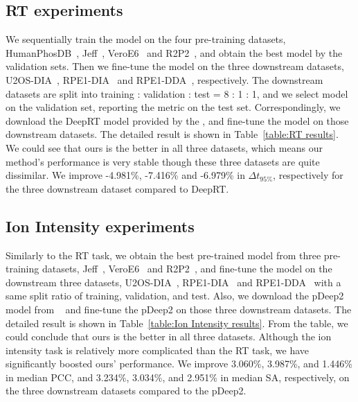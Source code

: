 \subsection{RT experiments}
We sequentially train the model on the four pre-training datasets, HumanPhosDB~\cite{lawrence2016plug}, Jeff~\cite{liu2018vivo}, VeroE6~\cite{bouhaddou2020global} and R2P2~\cite{leutert2019r2}, and obtain the best model by the validation sets. Then we fine-tune the model on the three downstream datasets, U2OS-DIA~\cite{wang2020naguider}, RPE1-DIA~\cite{bekker2020rapid} and RPE1-DDA~\cite{bekker2020rapid}, respectively. 
The downstream datasets are split into training : validation : test = 8 : 1 : 1, and we select model on the validation set, reporting the metric on the test set. 
Correspondingly, we download the DeepRT model provided by the \cite{ma2018improved}, and fine-tune the model on those downstream datasets. The detailed result is shown in Table~\ref{table:RT results}. We could see that ours is the better in all three datasets, which means our method's performance is very stable though these three datasets are quite dissimilar. We improve -4.981\%, -7.416\% and -6.979\% in $\Delta$$t_{95\%}$, respectively for the three downstream dataset compared to DeepRT. 

\subsection{Ion Intensity experiments}
Similarly to the RT task, we obtain the best pre-trained model from three pre-training datasets, Jeff~\cite{liu2018vivo}, VeroE6~\cite{bouhaddou2020global} and R2P2~\cite{leutert2019r2}, and fine-tune the model on the downstream three datasets, U2OS-DIA~\cite{wang2020naguider}, RPE1-DIA~\cite{bekker2020rapid} and RPE1-DDA~\cite{bekker2020rapid} with a same split ratio of training, validation, and test. Also, we download the pDeep2 model from ~\cite{zeng2019ms} and fine-tune the pDeep2 on those three downstream datasets. The detailed result is shown in Table~\ref{table:Ion Intensity results}. From the table, we could conclude that ours is the better in all three datasets. Although the ion intensity task is relatively more complicated than the RT task, we have significantly boosted ours' performance. We improve 3.060\%, 3.987\%, and 1.446\% in median PCC, and 3.234\%, 3.034\%, and 2.951\% in median SA, respectively, on the three downstream datasets compared to the pDeep2.

